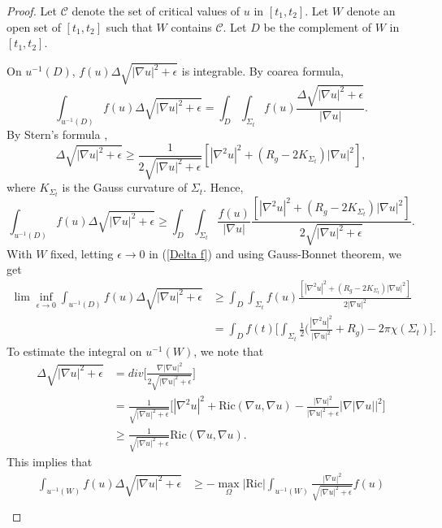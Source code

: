 \documentclass[12pt]{article}
\theoremstyle{definition}
\theoremstyle{plain}
\numberwithin{equation}{section}
\begin{document}
\begin{proof}
Let $ \mathcal{C} $ denote the set of critical values of $ u $ in $ [t_{1},t_{2}] $. Let $ W $ denote an open set of $ [t_{1},t_{2}] $ such that $ W $ contains $ \mathcal{C} $. Let $ D $ be the complement of $ W $ in  $ [t_{1},t_{2}] $.

On $ u^{-1}(D) $, $ f(u)\Delta \sqrt{|\nabla u|^{2}+\epsilon} $ is integrable. By coarea formula,
$$
\int_{u^{-1}(D)}f(u)\Delta \sqrt{|\nabla u|^{2}+\epsilon}=\int_{D}\int_{\Sigma_{t}}f(u)\frac{\Delta \sqrt{|\nabla u|^{2}+\epsilon}}{|\nabla u|}.
$$
By Stern's formula \cite{Stern},
$$
\Delta \sqrt{|\nabla u|^{2}+\epsilon}\geq \frac{1}{2\sqrt{|\nabla u|^{2}+\epsilon}}[|\nabla^{2}u|^{2}+(R_{g}-2K_{\Sigma_{t}})|\nabla u|^{2}],
$$
where $ K_{\Sigma_{t}} $ is the Gauss curvature of $ \Sigma_{t} $. Hence,
\begin{equation}\label{Delta f}
\int_{u^{-1}(D)}f(u)\Delta \sqrt{|\nabla u|^{2}+\epsilon}\geq \int_{D}\int_{\Sigma_{t}}\frac{f(u)}{|\nabla u|}\frac{[|\nabla^{2}u|^{2}+(R_{g}-2K_{\Sigma_{t}})|\nabla u|^{2}]}{2\sqrt{|\nabla u|^{2}+\epsilon}}.
\end{equation}
With $ W $ fixed, letting $ \epsilon\to 0 $ in (\ref{Delta f}) and using Gauss-Bonnet theorem, we get
\begin{equation}\label{D}
\begin{aligned}
\lim\limits\inf_{\epsilon\to 0}\int_{u^{-1}(D)}f(u)\Delta \sqrt{|\nabla u|^{2}+\epsilon}&\geq \int_{D}\int_{\Sigma_{t}}f(u)\frac{[|\nabla^{2}u|^{2}+(R_{g}-2K_{\Sigma_{t}})|\nabla u|^{2}]}{2|\nabla u|^{2}}\\
&=\int_{D}f(t)\Big[\int_{\Sigma_{t}}\frac{1}{2}\Big(\frac{|\nabla^{2}u|^{2}}{|\nabla u|^{2}}+R_{g}\Big)-2\pi \chi(\Sigma_{t}) \Big].
\end{aligned}
\end{equation}
To estimate the integral on $ u^{-1}(W) $, we note that 
$$
\begin{aligned}
\Delta \sqrt{|\nabla u|^{2}+\epsilon}&=div\Big[\frac{\nabla |\nabla u|^{2}}{2\sqrt{|\nabla u|^{2}+\epsilon}}\Big]\\
&=\frac{1}{\sqrt{|\nabla u|^{2}+\epsilon}}\Big[|\nabla^{2}u|^{2}+\mathrm{Ric}(\nabla u,\nabla u)-\frac{|\nabla u|^{2}}{|\nabla u|^{2}+\epsilon}|\nabla |\nabla u||^{2} \Big]\\
&\geq \frac{1}{\sqrt{|\nabla u|^{2}+\epsilon}}\mathrm{Ric}(\nabla u,\nabla u).
\end{aligned}
$$
This implies that 
\begin{equation}\label{W}
\begin{aligned}
\int_{u^{-1}(W)}f(u)\Delta \sqrt{|\nabla u|^{2}+\epsilon}&\geq -\max_{\Omega}|\mathrm{Ric}|\int_{u^{-1}(W)}\frac{|\nabla u|^{2}}{\sqrt{|\nabla u|^{2}+\epsilon}}f(u)\\

\end{aligned}
\end{equation}
\end{proof}
\end{document}
